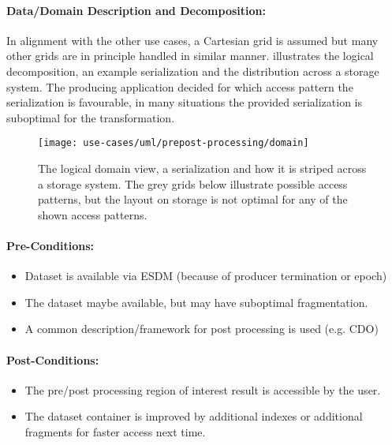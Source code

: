 \paragraph{Data/Domain Description and Decomposition:}
In alignment with the other use cases, a Cartesian grid is assumed but many other grids are in principle handled in similar manner.
 illustrates the logical decomposition, an example serialization and the distribution across a storage system.
The producing application decided for which access pattern the serialization is favourable, in many situations the provided serialization is suboptimal for the transformation.


\begin{figure}
	\centering
	\texttt{[image: use-cases/uml/prepost-processing/domain]}
	\caption{The logical domain view, a serialization and how it is striped across a storage system. The grey grids below illustrate possible access patterns, but the layout on storage is not optimal for any of the shown access patterns. }
	\label{fig:domain pre + post processing}
\end{figure}


\paragraph{Pre-Conditions:}
\begin{itemize}
	\item Dataset is available via ESDM (because of producer termination or epoch)
	\item The dataset maybe available, but may have suboptimal fragmentation.
	\item A common description/framework for post processing is used (e.g. CDO)
\end{itemize}

\paragraph{Post-Conditions:}
\begin{itemize}
	\item The pre/post processing region of interest result is accessible by the user.
	\item The dataset container is improved by additional indexes or additional fragments for faster access next time.
\end{itemize}

